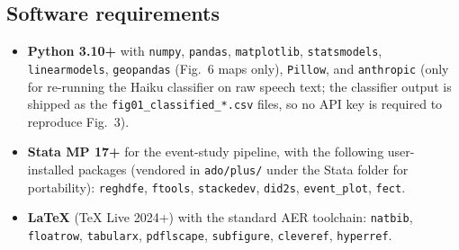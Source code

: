 \subsection{Software requirements}

\begin{itemize}[leftmargin=*, itemsep=0.2em]
\item \textbf{Python 3.10+} with \texttt{numpy}, \texttt{pandas},
      \texttt{matplotlib}, \texttt{statsmodels}, \texttt{linearmodels},
      \texttt{geopandas} (Fig.~6 maps only), \texttt{Pillow}, and
      \texttt{anthropic} (only for re-running the Haiku classifier on
      raw speech text; the classifier output is shipped as the
      \texttt{fig01\_classified\_*.csv} files, so no API key is required
      to reproduce Fig.~3).
\item \textbf{Stata MP 17+} for the event-study pipeline, with the
      following user-installed packages (vendored in \texttt{ado/plus/}
      under the Stata folder for portability):
      \texttt{reghdfe}, \texttt{ftools}, \texttt{stackedev},
      \texttt{did2s}, \texttt{event\_plot}, \texttt{fect}.
\item \textbf{LaTeX} (TeX Live 2024+) with the standard AER toolchain:
      \texttt{natbib}, \texttt{floatrow}, \texttt{tabularx},
      \texttt{pdflscape}, \texttt{subfigure}, \texttt{cleveref},
      \texttt{hyperref}.
\end{itemize}

